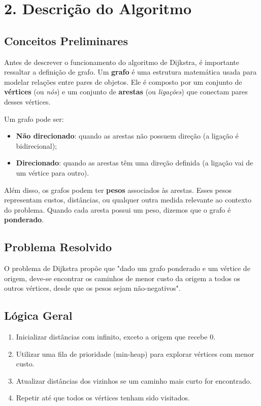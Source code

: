 \documentclass[12pt,a4paper]{report}
\begin{document}
\chapter{2. Descrição do Algoritmo}

\section*{Conceitos Preliminares}

Antes de descrever o funcionamento do algoritmo de Dijkstra, é importante ressaltar a definição de grafo. Um \textbf{grafo} é uma estrutura matemática usada para modelar relações entre pares de objetos. Ele é composto por um conjunto de \textbf{vértices} (ou \textit{nós}) e um conjunto de \textbf{arestas} (ou \textit{ligações}) que conectam pares desses vértices.

Um grafo pode ser:
\begin{itemize}
  \item \textbf{Não direcionado}: quando as arestas não possuem direção (a ligação é bidirecional);
  \item \textbf{Direcionado}: quando as arestas têm uma direção definida (a ligação vai de um vértice para outro).
\end{itemize}

Além disso, os grafos podem ter \textbf{pesos} associados às arestas. Esses pesos representam custos, distâncias, ou qualquer outra medida relevante ao contexto do problema. Quando cada aresta possui um peso, dizemos que o grafo é \textbf{ponderado}.

\section*{Problema Resolvido}
O problema de Dijkstra propõe que "dado um grafo ponderado e um vértice de origem, deve-se encontrar os caminhos de menor custo da origem a todos os outros vértices, desde que os pesos sejam não-negativos".

\section*{Lógica Geral}
\begin{enumerate}
    \item Inicializar distâncias com infinito, exceto a origem que recebe 0.
    \item Utilizar uma fila de prioridade (min-heap) para explorar vértices com menor custo.
    \item Atualizar distâncias dos vizinhos se um caminho mais curto for encontrado.
    \item Repetir até que todos os vértices tenham sido visitados.
\end{enumerate}
\end{document}
